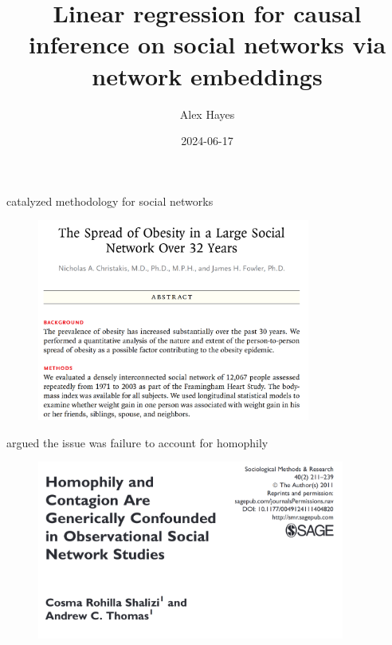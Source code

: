 \documentclass[aspectratio=169]{beamer}
\title{Linear regression for causal inference on social networks via network embeddings}
\date{2024-06-17}
\author{Alex Hayes}
\institute{University of Wisconsin-Madison}
\theoremstyle{remark}
\begin{document}
\maketitle

\begin{frame}{\citealt{christakis2007} catalyzed methodology for social networks}
    \begin{figure}
        \centering
        \includegraphics[width=0.8\textwidth]{./figures/christakis2.png}
    \end{figure}
\end{frame}

\begin{frame}{\citealt{shalizi2011} argued the issue was failure to account for homophily}
    \begin{figure}
        \centering
        \includegraphics[width=0.9\textwidth]{./figures/shalizi20112.png}
    \end{figure}
\end{frame}
\end{document}
